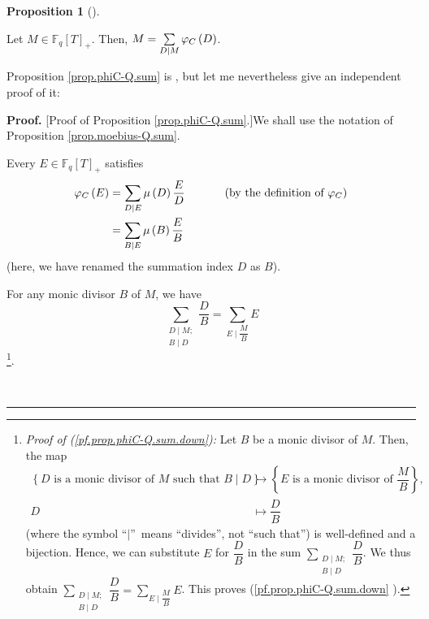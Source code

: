 \documentclass[numbers=enddot,12pt,final,onecolumn,notitlepage]{scrartcl}%
\theoremstyle{definition}
\newtheorem{prop}[theo]{Proposition}
\newenvironment{proposition}[1][]
{\begin{prop}[#1]\begin{leftbar}}
{\end{leftbar}\end{prop}}
\newenvironment{proof}[1][Proof]{\noindent\textbf{#1.} }{\ \rule{0.5em}{0.5em}}
\let\sumnonlimits\sum
\renewcommand{\sum}{\sumnonlimits\limits}
\begin{document}
\begin{proposition}
\label{prop.phiC-Q.sum}Let $M\in\mathbb{F}_{q}\left[  T\right]  _{+}$. Then,
$M=\sum\limits_{D\mid M}\varphi_{C}\left(  D\right)  $.
\end{proposition}

Proposition \ref{prop.phiC-Q.sum} is \cite[Theorem 4.5 (2)]{kc-carlitz}, but
let me nevertheless give an independent proof of it:

\begin{proof}
[Proof of Proposition \ref{prop.phiC-Q.sum}.]We shall use the notation of
Proposition \ref{prop.moebius-Q.sum}.

Every $E\in\mathbb{F}_{q}\left[  T\right]  _{+}$ satisfies%
\begin{align}
\varphi_{C}\left(  E\right)   &  =\sum\limits_{D\mid E}\mu\left(  D\right)
\dfrac{E}{D}\ \ \ \ \ \ \ \ \ \ \left(  \text{by the definition of }%
\varphi_{C}\right) \nonumber\\
&  =\sum_{B\mid E}\mu\left(  B\right)  \dfrac{E}{B}
\label{pf.prop.phiC-Q.sum.phiCE=}%
\end{align}
(here, we have renamed the summation index $D$ as $B$).

For any monic divisor $B$ of $M$, we have%
\begin{equation}
\sum_{\substack{D\mid M;\\B\mid D}}\dfrac{D}{B}=\sum_{E\mid\dfrac{M}{B}}E
\label{pf.prop.phiC-Q.sum.down}%
\end{equation}
\footnote{\textit{Proof of (\ref{pf.prop.phiC-Q.sum.down}):} Let $B$ be a
monic divisor of $M$. Then, the map%
\begin{align*}
\left\{  D\text{ is a monic divisor of }M\text{ such that }B\mid D\right\}
&  \rightarrow\left\{  E\text{ is a monic divisor of }\dfrac{M}{B}\right\}
,\\
D  &  \mapsto\dfrac{D}{B}%
\end{align*}
(where the symbol \textquotedblleft$\mid$\textquotedblright\ means
\textquotedblleft divides\textquotedblright, not \textquotedblleft such
that\textquotedblright) is well-defined and a bijection. Hence, we can
substitute $E$ for $\dfrac{D}{B}$ in the sum $\sum_{\substack{D\mid M;\\B\mid
D}}\dfrac{D}{B}$. We thus obtain $\sum_{\substack{D\mid M;\\B\mid D}}\dfrac
{D}{B}=\sum_{E\mid\dfrac{M}{B}}E$. This proves (\ref{pf.prop.phiC-Q.sum.down}%
).}.


\end{proof}
\end{document}
